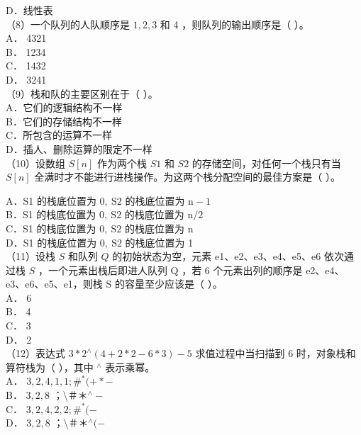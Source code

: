 \documentclass[10pt]{article}
\begin{document}
D．线性表\\
（8）一个队列的人队顺序是 $1,2,3$ 和 4 ，则队列的输出顺序是（ ）。\\
A． 4321\\
B． 1234\\
C． 1432\\
D． 3241\\
（9）栈和队的主要区别在于（ ）。\\
A．它们的逻辑结构不一样\\
B．它们的存储结构不一样\\
C．所包含的运算不一样\\
D．插人、删除运算的限定不一样\\
（10）设数组 $S[n]$ 作为两个栈 $S 1$ 和 $S 2$ 的存储空间，对任何一个栈只有当 $S[n]$ 全满时才不能进行进栈操作。为这两个栈分配空间的最佳方案是（ ）。

A．S1 的栈底位置为 $0, \mathrm{~S} 2$ 的栈底位置为 $\mathrm{n}-1$\\
B．S1 的栈底位置为 $0, \mathrm{~S} 2$ 的栈底位置为 $\mathrm{n} / 2$\\
C．S1 的栈底位置为 $0, \mathrm{~S} 2$ 的栈底位置为 n\\
D．S1 的栈底位置为 $0, \mathrm{~S} 2$ 的栈底位置为 1\\
（11）设栈 $S$ 和队列 $Q$ 的初始状态为空，元素 e1、e2、e3、e4、e5、e6 依次通过栈 $S$ ，一个元素出栈后即进人队列 Q ，若 6 个元素出列的顺序是 e2、e4、e3、e6、e5、e1，则栈 S 的容量至少应该是（ ）。\\
A． 6\\
B． 4\\
C． 3\\
D． 2\\
（12）表达式 $3 * 2^{\wedge}(4+2 * 2-6 * 3)-5$ 求值过程中当扫描到 6 时，对象栈和算符栈为（ ），其中 ${ }^{\wedge}$ 表示乘幂。\\
A． $3,2,4,1,1 ; \#^{*}(+*-$\\
B． $3,2,8$ ；\textbackslash ＃＊${ }^{\wedge}-$\\
C． $3,2,4,2,2 ; \#^{*}(-$\\
D． $3,2,8$ ；\textbackslash ＃＊${ }^{\wedge}(-$
\end{document}
